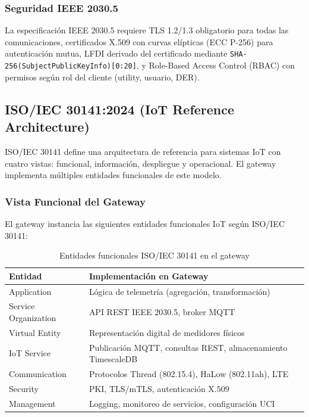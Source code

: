 \subsubsection{Seguridad IEEE 2030.5}

La especificación IEEE 2030.5 requiere TLS 1.2/1.3 obligatorio para todas las comunicaciones, certificados X.509 con curvas elípticas (ECC P-256) para autenticación mutua, LFDI derivado del certificado mediante \texttt{SHA-256(SubjectPublicKeyInfo)[0:20]}, y Role-Based Access Control (RBAC) con permisos según rol del cliente (utility, usuario, DER).

\subsection{ISO/IEC 30141:2024 (IoT Reference Architecture)}

ISO/IEC 30141 define una arquitectura de referencia para sistemas IoT con cuatro vistas: funcional, información, despliegue y operacional. El gateway implementa múltiples entidades funcionales de este modelo.

\subsubsection{Vista Funcional del Gateway}

El gateway instancia las siguientes entidades funcionales IoT según ISO/IEC 30141:

\begin{table}[h]
\centering
\caption{Entidades funcionales ISO/IEC 30141 en el gateway}
\begin{tabular}{|l|p{10cm}|}
\hline
\textbf{Entidad} & \textbf{Implementación en Gateway} \\ \hline
Application & Lógica de telemetría (agregación, transformación) \\ \hline
Service Organization & API REST IEEE 2030.5, broker MQTT \\ \hline
Virtual Entity & Representación digital de medidores físicos \\ \hline
IoT Service & Publicación MQTT, consultas REST, almacenamiento TimescaleDB \\ \hline
Communication & Protocolos Thread (802.15.4), HaLow (802.11ah), LTE \\ \hline
Security & PKI, TLS/mTLS, autenticación X.509 \\ \hline
Management & Logging, monitoreo de servicios, configuración UCI \\ \hline
\end{tabular}
\end{table}

